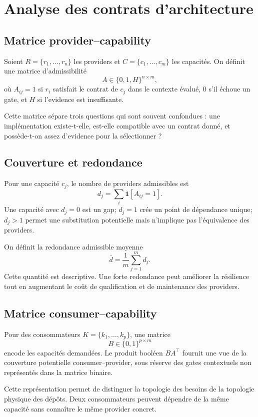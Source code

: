 \chapter{Analyse des contrats d'architecture}

\section{Matrice provider--capability}

Soient $R=\{r_1,\ldots,r_n\}$ les providers et $C=\{c_1,\ldots,c_m\}$ les capacités. On définit une matrice d'admissibilité
\[
A\in\{0,1,H\}^{n\times m},
\]
où $A_{ij}=1$ si $r_i$ satisfait le contrat de $c_j$ dans le contexte évalué, $0$ s'il échoue un gate, et $H$ si l'evidence est insuffisante.

Cette matrice sépare trois questions qui sont souvent confondues : une implémentation existe-t-elle, est-elle compatible avec un contrat donné, et possède-t-on assez d'evidence pour la sélectionner ?

\section{Couverture et redondance}

Pour une capacité $c_j$, le nombre de providers admissibles est
\[
d_j=\sum_i \mathbf 1[A_{ij}=1].
\]
Une capacité avec $d_j=0$ est un gap; $d_j=1$ crée un point de dépendance unique; $d_j>1$ permet une substitution potentielle mais n'implique pas l'équivalence des providers.

On définit la redondance admissible moyenne
\[
\bar d=\frac1m\sum_{j=1}^m d_j.
\]
Cette quantité est descriptive. Une forte redondance peut améliorer la résilience tout en augmentant le coût de qualification et de maintenance des providers.

\section{Matrice consumer--capability}

Pour des consommateurs $K=\{k_1,\ldots,k_p\}$, une matrice
\[
B\in\{0,1\}^{p\times m}
\]
encode les capacités demandées. Le produit booléen $BA^\top$ fournit une vue de la couverture potentielle consumer--provider, sous réserve des gates contextuels non représentés dans la matrice binaire.

Cette représentation permet de distinguer la topologie des besoins de la topologie physique des dépôts. Deux consommateurs peuvent dépendre de la même capacité sans connaître le même provider concret.

